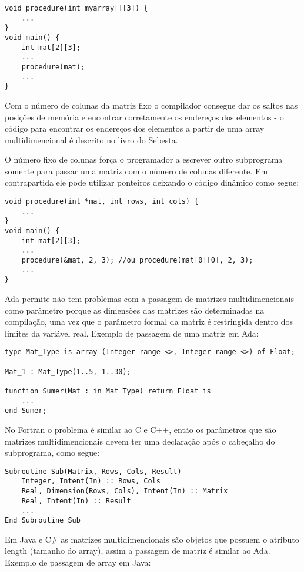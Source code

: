 \begin{verbatim}
void procedure(int myarray[][3]) {
    ...
}
void main() {
    int mat[2][3];
    ...
    procedure(mat);
    ...
}
\end{verbatim}

Com o número de colunas da matriz fixo o compilador consegue dar os saltos nas posições de memória e encontrar corretamente os endereços dos elementos - o código para encontrar os endereços dos elementos a partir de uma array multidimencional é descrito no livro do Sebesta.

O número fixo de colunas força o programador a escrever outro subprograma somente para passar uma matriz com o número de colunas diferente. Em contrapartida ele pode utilizar ponteiros deixando o código dinâmico como segue:

\begin{verbatim}
void procedure(int *mat, int rows, int cols) {
    ...
}
void main() {
    int mat[2][3];
    ...
    procedure(&mat, 2, 3); //ou procedure(mat[0][0], 2, 3);
    ...
}
\end{verbatim}

Ada permite não tem problemas com a passagem de matrizes multidimencionais como parâmetro porque as dimensões das matrizes são determinadas na compilação, uma vez que o parâmetro formal da matriz é restringida dentro dos limites da variável real. Exemplo de passagem de uma matriz em Ada:

\begin{verbatim}
type Mat_Type is array (Integer range <>, Integer range <>) of Float;

Mat_1 : Mat_Type(1..5, 1..30);

function Sumer(Mat : in Mat_Type) return Float is
    ...
end Sumer;
\end{verbatim}

No Fortran o problema é similar ao C e C++, então os parâmetros que são matrizes multidimencionais devem ter uma declaração após o cabeçalho do subprograma, como segue:

\begin{verbatim}
Subroutine Sub(Matrix, Rows, Cols, Result)
    Integer, Intent(In) :: Rows, Cols
    Real, Dimension(Rows, Cols), Intent(In) :: Matrix
    Real, Intent(In) :: Result
    ...
End Subroutine Sub
\end{verbatim}

Em Java e C\# as matrizes multidimencionais são objetos que possuem o atributo length (tamanho do array), assim a passagem de matriz é similar ao Ada. Exemplo de passagem de array em Java:

